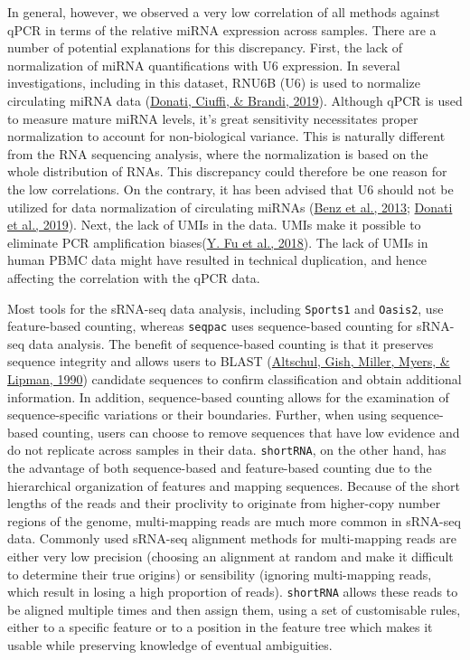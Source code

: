\documentclass[12pt,twoside]{reedthesis}
\begin{document}
In general, however, we observed a very low correlation of all methods
against qPCR in terms of the relative miRNA expression across samples.
There are a number of potential explanations for this discrepancy.
First, the lack of normalization of miRNA quantifications with U6
expression. In several investigations, including in this dataset, RNU6B
(U6) is used to normalize circulating miRNA data (\protect\hyperlink{ref-donati2019}{Donati, Ciuffi, \& Brandi, 2019}). Although
qPCR is used to measure mature miRNA levels, it's great sensitivity
necessitates proper normalization to account for non-biological
variance. This is naturally different from the RNA sequencing analysis,
where the normalization is based on the whole distribution of RNAs. This
discrepancy could therefore be one reason for the low correlations. On
the contrary, it has been advised that U6 should not be utilized for
data normalization of circulating miRNAs (\protect\hyperlink{ref-benz2013}{Benz et al., 2013}; \protect\hyperlink{ref-donati2019}{Donati et al., 2019}). Next,
the lack of UMIs in the data. UMIs make it possible to eliminate PCR
amplification biases(\protect\hyperlink{ref-fu2018}{Y. Fu et al., 2018}). The lack of UMIs in human PBMC data might
have resulted in technical duplication, and hence affecting the
correlation with the qPCR data.

Most tools for the sRNA-seq data analysis, including \texttt{Sports1} and
\texttt{Oasis2}, use feature-based counting, whereas \texttt{seqpac} uses
sequence-based counting for sRNA-seq data analysis. The benefit of
sequence-based counting is that it preserves sequence integrity and
allows users to BLAST (\protect\hyperlink{ref-altschul1990}{Altschul, Gish, Miller, Myers, \& Lipman, 1990}) candidate sequences to confirm
classification and obtain additional information. In addition,
sequence-based counting allows for the examination of sequence-specific
variations or their boundaries. Further, when using sequence-based
counting, users can choose to remove sequences that have low evidence
and do not replicate across samples in their data. \texttt{shortRNA}, on the
other hand, has the advantage of both sequence-based and feature-based
counting due to the hierarchical organization of features and mapping
sequences. Because of the short lengths of the reads and their
proclivity to originate from higher-copy number regions of the genome,
multi-mapping reads are much more common in sRNA-seq data. Commonly used
sRNA-seq alignment methods for multi-mapping reads are either very low
precision (choosing an alignment at random and make it difficult to
determine their true origins) or sensibility (ignoring multi-mapping
reads, which result in losing a high proportion of reads). \texttt{shortRNA}
allows these reads to be aligned multiple times and then assign them,
using a set of customisable rules, either to a specific feature or to a
position in the feature tree which makes it usable while preserving
knowledge of eventual ambiguities.
\end{document}
